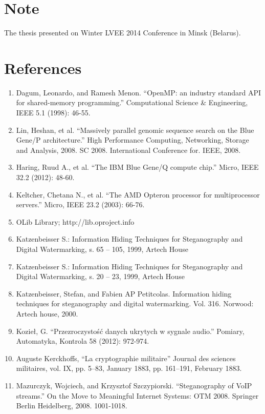 \documentclass[10pt, a5paper]{article}
\begin{document}
\section*{Note}
The thesis presented on Winter LVEE 2014 Conference in Minsk (Belarus).
\section*{References}
\longpage
\begin{enumerate}
  \item Dagum, Leonardo, and Ramesh Menon. ``OpenMP: an industry standard API for shared-memory programming.'' Computational Science \& Engineering, IEEE 5.1 (1998): 46-55.
  \item Lin, Heshan, et al. ``Massively parallel genomic sequence search on the Blue Gene/P architecture.'' High Performance Computing, Networking, Storage and Analysis, 2008. SC 2008. International Conference for. IEEE, 2008.
  \item Haring, Ruud A., et al. ``The IBM Blue Gene/Q compute chip.'' Micro, IEEE 32.2 (2012): 48-60.
  \item Keltcher, Chetana N., et al. ``The AMD Opteron processor for multiprocessor servers.'' Micro, IEEE 23.2 (2003): 66-76.
  \item OLib Library; http://lib.oproject.info
  \item Katzenbeisser S.: Information Hiding Techniques for Steganography and Digital Watermarking, s. 65 -- 105, 1999, Artech House
  \item Katzenbeisser S.: Information Hiding Techniques for Steganography and Digital Watermarking, s. 20 -- 23, 1999, Artech House
  \item Katzenbeisser, Stefan, and Fabien AP Petitcolas. Information hiding techniques for steganography and digital watermarking. Vol. 316. Norwood: Artech house, 2000.
  \item Kozieł, G. ``Przezroczystość danych ukrytych w sygnale audio.'' Pomiary, Automatyka, Kontrola 58 (2012): 972-974.
  \item Auguste Kerckhoffs, ``La cryptographie militaire'' Journal des sciences militaires, vol. IX, pp. 5–83, January 1883, pp. 161–191, February 1883.
  \item Mazurczyk, Wojciech, and Krzysztof Szczypiorski. ``Steganography of VoIP streams.'' On the Move to Meaningful Internet Systems: OTM 2008. Springer Berlin Heidelberg, 2008. 1001-1018.
\end{enumerate}
\end{document}

